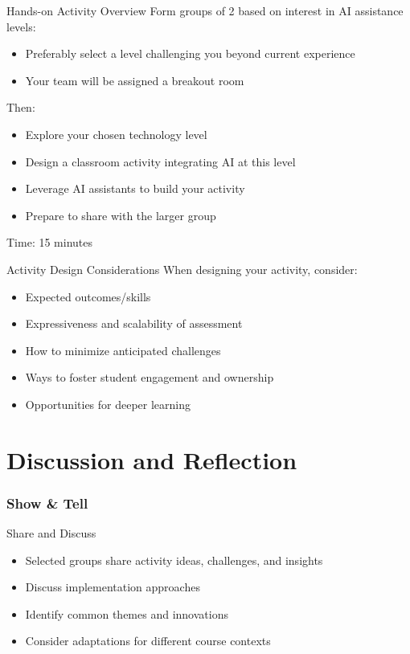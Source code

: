 \documentclass[xcolor={dvipsnames}, aspectratio=169]{beamer}
\begin{document}
\begin{frame}{Hands-on Activity Overview}
  Form groups of 2 based on interest in AI assistance levels:
  \begin{itemize}
    \item Preferably select a level challenging you beyond current experience
    \item Your team will be assigned a breakout room
  \end{itemize}
  
  Then:
  \begin{itemize}
    \item Explore your chosen technology level
    \item Design a classroom activity integrating AI at this level
    \item Leverage AI assistants to build your activity
    \item Prepare to share with the larger group
  \end{itemize}
  
  Time: 15 minutes
\end{frame}

\begin{frame}{Activity Design Considerations}
  When designing your activity, consider:
  \begin{itemize}
    \item Expected outcomes/skills
    \item Expressiveness and scalability of assessment
    \item How to minimize anticipated challenges
    \item Ways to foster student engagement and ownership
    \item Opportunities for deeper learning
  \end{itemize}
\end{frame}

\part[Discussion and Reflection]{Discussion and Reflection}
\section{Show \& Tell}

\begin{frame}{Share and Discuss}
  \begin{itemize}
    \item Selected groups share activity ideas, challenges, and insights
    \item Discuss implementation approaches
    \item Identify common themes and innovations
    \item Consider adaptations for different course contexts
  \end{itemize}
\end{frame}
\end{document}
